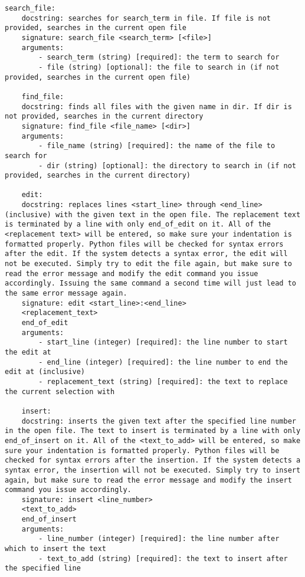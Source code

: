 \begin{lstlisting}[caption={System Propmt}, label={lst:system_prompt}, captionpos=t]
    search_file:
    docstring: searches for search_term in file. If file is not provided, searches in the current open file
    signature: search_file <search_term> [<file>]
    arguments:
        - search_term (string) [required]: the term to search for
        - file (string) [optional]: the file to search in (if not provided, searches in the current open file)

    find_file:
    docstring: finds all files with the given name in dir. If dir is not provided, searches in the current directory
    signature: find_file <file_name> [<dir>]
    arguments:
        - file_name (string) [required]: the name of the file to search for
        - dir (string) [optional]: the directory to search in (if not provided, searches in the current directory)

    edit:
    docstring: replaces lines <start_line> through <end_line> (inclusive) with the given text in the open file. The replacement text is terminated by a line with only end_of_edit on it. All of the <replacement text> will be entered, so make sure your indentation is formatted properly. Python files will be checked for syntax errors after the edit. If the system detects a syntax error, the edit will not be executed. Simply try to edit the file again, but make sure to read the error message and modify the edit command you issue accordingly. Issuing the same command a second time will just lead to the same error message again.
    signature: edit <start_line>:<end_line>
    <replacement_text>
    end_of_edit
    arguments:
        - start_line (integer) [required]: the line number to start the edit at
        - end_line (integer) [required]: the line number to end the edit at (inclusive)
        - replacement_text (string) [required]: the text to replace the current selection with

    insert:
    docstring: inserts the given text after the specified line number in the open file. The text to insert is terminated by a line with only end_of_insert on it. All of the <text_to_add> will be entered, so make sure your indentation is formatted properly. Python files will be checked for syntax errors after the insertion. If the system detects a syntax error, the insertion will not be executed. Simply try to insert again, but make sure to read the error message and modify the insert command you issue accordingly.
    signature: insert <line_number>
    <text_to_add>
    end_of_insert
    arguments:
        - line_number (integer) [required]: the line number after which to insert the text
        - text_to_add (string) [required]: the text to insert after the specified line


\end{lstlisting}
